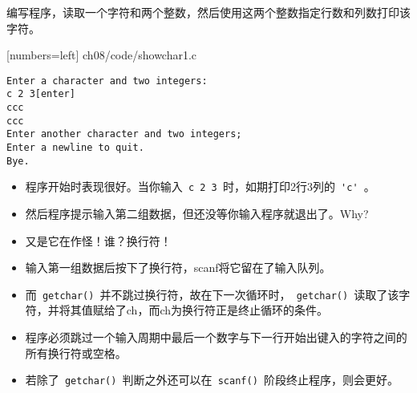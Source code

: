 \begin{frame}[fragile]
编写程序，读取一个字符和两个整数，然后使用这两个整数指定行数和列数打印该字符。
\end{frame}

\begin{frame}

[numbers=left]
{ch08/code/showchar1.c}
\end{frame}

\begin{frame}[fragile]
\begin{lstlisting}
Enter a character and two integers:
c 2 3[enter]
ccc
ccc
Enter another character and two integers;
Enter a newline to quit.
Bye.
\end{lstlisting}
\end{frame}

\begin{frame}[fragile]
\begin{itemize}
\item
程序开始时表现很好。当你输入\lstinline| c 2 3 |时，如期打印2行3列的\lstinline| 'c' |。\\[0.1in]
\item
然后程序提示输入第二组数据，但还没等你输入程序就退出了。Why? \pause \\[0.1in]
\item[] 又是它在作怪！\pause 谁？\pause 换行符！ \pause \\[0.1in]
\item 
输入第一组数据后按下了换行符，scanf将它留在了输入队列。
\\[0.1in]
\item[] 而\lstinline| getchar() |并不跳过换行符，故在下一次循环时，\lstinline| getchar() |读取了该字符，并将其值赋给了ch，而ch为换行符正是终止循环的条件。
\end{itemize}
\end{frame}

\begin{frame}[fragile]
\begin{itemize}
\item
程序必须跳过一个输入周期中最后一个数字与下一行开始出键入的字符之间的所有换行符或空格。 \\[0.1in]
\item
若除了\lstinline| getchar() |判断之外还可以在\lstinline| scanf() |阶段终止程序，则会更好。
\end{itemize}
\end{frame}

